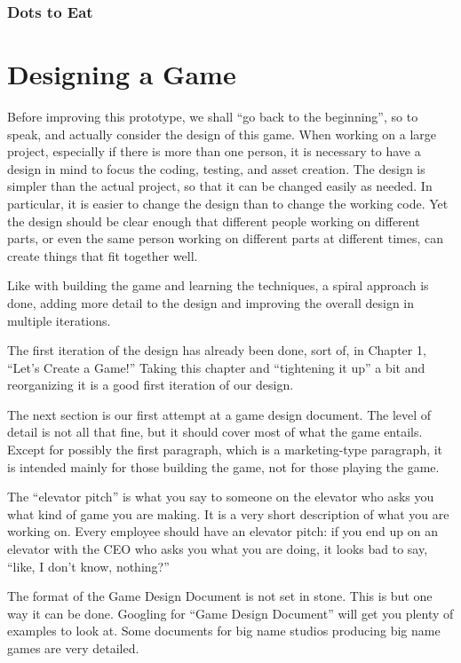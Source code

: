 \documentclass[12pt]{amsbook}
\theoremstyle{definition}
\theoremstyle{remark}
\numberwithin{figure}{chapter}
\numberwithin{table}{chapter}
\numberwithin{section}{chapter}
\numberwithin{equation}{section}
\begin{document}
\subsection{Dots to Eat}

\chapter{Designing a Game}

Before improving this prototype, we shall ``go back to the beginning'', so to speak, and actually consider the design of this game.  When working on a large project, especially if there is more than one person, it is necessary to have a design in mind to focus the coding, testing, and asset creation.  The design is simpler than the actual project, so that it can be changed easily as needed.  In particular, it is easier to change the design than to change the working code.  Yet the design should be clear enough that different people working on different parts, or even the same person working on different parts at different times, can create things that fit together well.

Like with building the game and learning the techniques, a spiral approach is done, adding more detail to the design and improving the overall design in multiple iterations.  

The first iteration of the design has already been done, sort of, in Chapter 1, ``Let's Create a Game!''  Taking this chapter and ``tightening it up'' a bit and reorganizing it is a good first iteration of our design.  

The next section is our first attempt at a game design document.  The level of detail is not all that fine, but it should cover most of what the game entails.  Except for possibly the first paragraph, which is a marketing-type paragraph, it is intended mainly for those building the game, not for those playing the game.

The ``elevator pitch'' is what you say to someone on the elevator who asks you what kind of game you are making.  It is a very short description of what you are working on.  Every employee should have an elevator pitch: if you end up on an elevator with the CEO who asks you what you are doing, it looks bad to say, ``like, I don't know, nothing?''

The format of the Game Design Document is not set in stone.  This is but one way it can be done.  Googling for ``Game Design Document'' will get you plenty of examples to look at.  Some documents for big name studios producing big name games are very detailed.
\end{document}
